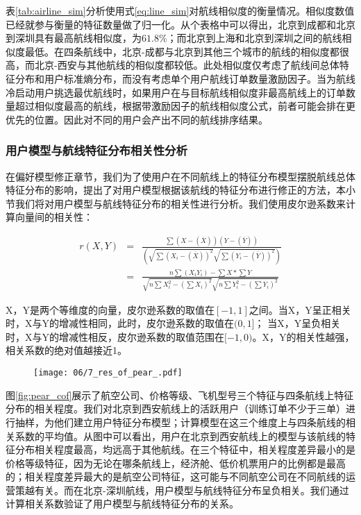 表\ref{tab:airline_sim}分析使用式\ref{eq:line_sim}对航线相似度的衡量情况。相似度数值已经就参与衡量的特征数量做了归一化。从个表格中可以得出，北京到成都和北京到深圳具有最高航线相似度，为$61.8\%$；而北京到上海和北京到深圳之间的航线相似度最低。在四条航线中，北京-成都与北京到其他三个城市的航线的相似度都很高，而北京-西安与其他航线的相似度都较低。此处相似度仅考虑了航线间总体特征分布和用户标准熵分布，而没有考虑单个用户航线订单数量激励因子。当为航线冷启动用户挑选最优航线时，如果用户在与目标航线相似度非最高航线上的订单数量超过相似度最高的航线，根据带激励因子的航线相似度公式，前者可能会排在更优先的位置。因此对不同的用户会产出不同的航线排序结果。

\subsubsection{用户模型与航线特征分布相关性分析}

在偏好模型修正章节，我们为了使用户在不同航线上的特征分布模型摆脱航线总体特征分布的影响，提出了对用户模型根据该航线的特征分布进行修正的方法，本小节我们将对用户模型与航线特征分布的相关性进行分析。我们使用皮尔逊系数来计算向量间的相关性：

\begin{eqnarray}
	r(X,Y)  & = & \frac{\sum(X-(\overline{X}))(Y-(\overline{Y}))}{(\sqrt{\sum(X_i-(\overline{X}))^2}\sqrt{\sum(Y_i-(\overline{Y}))^2})} \nonumber \\
	& = & \frac{n\sum(X_iY_i)-\sum X *\sum Y}{\sqrt{n\sum X_i^2 - (\sum X_i)^2}\sqrt{n\sum Y_i^2 - (\sum Y_i)^2}}
\end{eqnarray}

X，Y是两个等维度的向量，皮尔逊系数的取值在$[-1,1]$之间。当X，Y呈正相关时，X与Y的增减性相同，此时，皮尔逊系数的取值在$(0,1]$；
当X，Y呈负相关时，X与Y的增减性相反，皮尔逊系数的取值范围在$[-1,0)$。X，Y的相关性越强，相关系数的绝对值越接近1。

\begin{figure}[!h]
 \centering
 \texttt{[image: 06/7\_res\_of\_pear\_.pdf]}
\end{figure}

图\ref{fig:pear_cof}展示了航空公司、价格等级、飞机型号三个特征与四条航线上特征分布的相关程度。我们对北京到西安航线上的活跃用户（训练订单不少于三单）进行抽样，为他们建立用户特征分布模型；计算模型在这三个维度上与四条航线的相关系数的平均值。从图中可以看出，用户在北京到西安航线上的模型与该航线的特征分布相关程度最高，均远高于其他航线。在三个特征中，相关程度差异最小的是价格等级特征，因为无论在哪条航线上，经济舱、低价机票用户的比例都是最高的；相关程度差异最大的是航空公司特征，这可能与不同航空公司在不同航线的运营策越有关。而在北京-深圳航线，用户模型与航线特征分布呈负相关。我们通过计算相关系数验证了用户模型与航线特征分布的关系。

